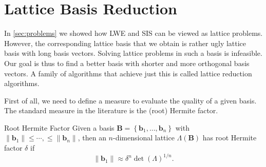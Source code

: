 
\section{Lattice Basis Reduction} %

In \cref{sec:problems} we showed how LWE and SIS can be viewed as lattice problems. %
However, the corresponding lattice basis that we obtain is rather ugly lattice basis with long basis vectors. Solving lattice problems in such a basis is infeasible. Our goal is thus to find a better basis with shorter and more orthogonal basis vectors. A family of algorithms that achieve just this is called lattice reduction algorithms.

First of all, we need to define a measure to evaluate the quality of a given basis. The standard measure in the literature is the (root) Hermite factor.




\begin{definition}{Root Hermite Factor \cite{LP11}}
  Given a basis $\mathbf{B} = \left\{\mathbf{b}_1, \ldots, \mathbf{b}_n\right\}$ with $\|\mathbf{b}_1\| \leq \cdots,  \leq \|\mathbf{b}_n\|$, then an $n$-dimensional lattice $\Lambda(\mathbf{B})$ has root Hermite factor $\delta$ if
  \begin{equation} \label{eq:hermite}
    \| \mathbf{b}_1 \| \approx \delta^n \det(\Lambda)^{1/n}.
  \end{equation}
\end{definition}



